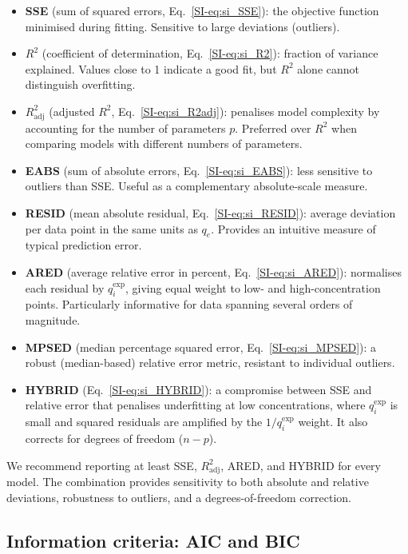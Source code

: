 \documentclass[journal=jacsat,manuscript=article]{achemso}
\begin{document}
	\begin{itemize}
		\item \textbf{SSE} (sum of squared errors, Eq.~\ref{SI-eq:si_SSE}): the objective function minimised during fitting. Sensitive to large deviations (outliers).
		\item \textbf{$R^2$} (coefficient of determination, Eq.~\ref{SI-eq:si_R2}): fraction of variance explained. Values close to 1 indicate a good fit, but $R^2$ alone cannot distinguish overfitting.
		\item \textbf{$R^2_{\mathrm{adj}}$} (adjusted $R^2$, Eq.~\ref{SI-eq:si_R2adj}): penalises model complexity by accounting for the number of parameters $p$. Preferred over $R^2$ when comparing models with different numbers of parameters.
		\item \textbf{EABS} (sum of absolute errors, Eq.~\ref{SI-eq:si_EABS}): less sensitive to outliers than SSE. Useful as a complementary absolute-scale measure.
		\item \textbf{RESID} (mean absolute residual, Eq.~\ref{SI-eq:si_RESID}): average deviation per data point in the same units as $q_e$. Provides an intuitive measure of typical prediction error.
		\item \textbf{ARED} (average relative error in percent, Eq.~\ref{SI-eq:si_ARED}): normalises each residual by $q_i^{\exp}$, giving equal weight to low- and high-concentration points. Particularly informative for data spanning several orders of magnitude.
		\item \textbf{MPSED} (median percentage squared error, Eq.~\ref{SI-eq:si_MPSED}): a robust (median-based) relative error metric, resistant to individual outliers.
		\item \textbf{HYBRID} (Eq.~\ref{SI-eq:si_HYBRID}): a compromise between SSE and relative error that penalises underfitting at low concentrations, where $q_i^{\exp}$ is small and squared residuals are amplified by the $1/q_i^{\exp}$ weight. It also corrects for degrees of freedom ($n - p$).
	\end{itemize}

	We recommend reporting at least SSE, $R^2_{\mathrm{adj}}$, ARED, and HYBRID for every model. The combination provides sensitivity to both absolute and relative deviations, robustness to outliers, and a degrees-of-freedom correction.
\subsection{Information criteria: AIC and BIC}
\label{sec:AIC_BIC}
\end{document}

